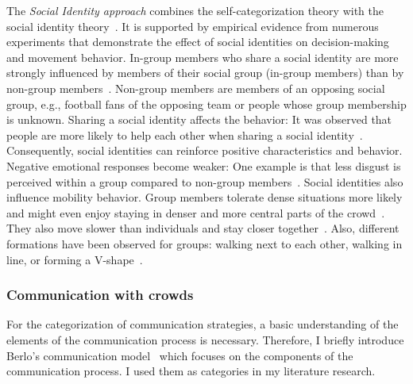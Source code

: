 The \textit{Social Identity approach} combines the self-categorization theory with the social identity theory~\cite{templeton-2020-life}.
It is supported by empirical evidence from numerous experiments that demonstrate the effect of social identities on decision-making and movement behavior. 
In-group members who share a social identity are more strongly influenced by members of their social group (in-group members) than by non-group members~\cite{levine-2005-life,carter-2015-life,reicher-2016-life,sivers-2014b-cdyn}. Non-group members are members of an opposing social group, e.g., football fans of the opposing team or people whose group membership is unknown. Sharing a social identity affects the behavior: It was observed that people are more likely to help each other when sharing a social identity~\cite{levine-2005-life}. Consequently, social identities can reinforce positive characteristics and behavior.  Negative emotional responses become weaker: One example is that less disgust is perceived within a group compared to non-group members~\cite{reicher-2016-life}. Social identities also influence mobility behavior. Group members tolerate dense situations more likely and might even enjoy  staying in denser and more central parts of the crowd~\cite{novelli-2013-life}. They also move slower than individuals and stay closer together~\cite{templeton-2018-cdyn}. 
Also, different formations have been observed for groups:  walking next to each other, walking in line, or forming a V-shape~\cite{gorrini-2014-cdyn, koster-2011b-cdyn, moussaid-2010-cdyn, qiu-2010-cdyn,subramanian-2022-cdyn}. 

\subsubsection{Communication with crowds}


For the categorization of communication strategies, a basic understanding of the elements of the communication process is necessary. Therefore, I briefly introduce Berlo's communication model~\cite{berlo-1960-life} which focuses on the components of the communication process. I used them as categories in my literature research. 

